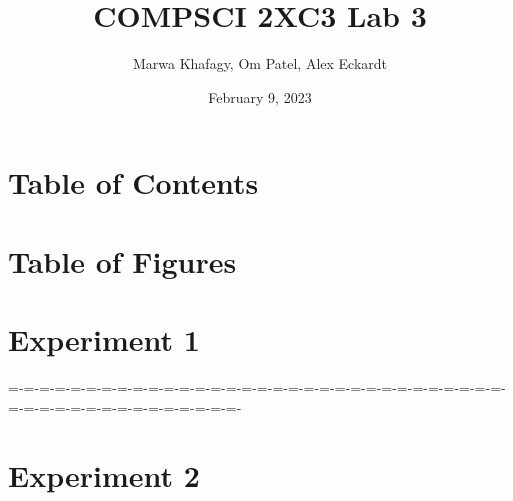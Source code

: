\documentclass[12pt]{article}
\title{COMPSCI 2XC3 Lab 3}
\author{Marwa Khafagy, Om Patel, Alex Eckardt}
\date{February 9, 2023}
\begin{document}
\maketitle

\newpage

\section*{Table of Contents}

\newpage

\section*{Table of Figures}

\newpage

%
%
%
%

\section*{Experiment 1}

=-=-=-=-=-=-=-=-=-=-=-=-=-=-=-=-=-=-=-=-=-=-=-=-=-=-=-=-=-=-=-=-=-=-=-=-=-=-=-=-=-=-=-=-=-=-=-
%
%
%
%

\newpage

%
%
%
%

\section*{Experiment 2}
\end{document}
